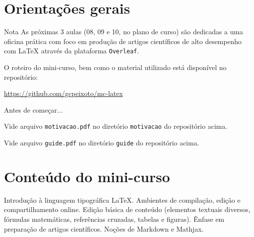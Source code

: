 
\section{Orientações gerais}

\begin{frame}{Nota}
As próximas 3 aulas (08, 09 e 10, no plano de curso) são dedicadas a uma oficina prática com foco em produção de artigos científicos de alto desempenho com {\LaTeX} através da plataforma \texttt{Overleaf}. 

O roteiro do mini-curso, bem como o material utilizado está disponível no repositório: 

\url{https://github.com/gcpeixoto/mc-latex}

\end{frame}

\begin{frame}{Antes de começar...} 

Vide arquivo \texttt{motivacao.pdf} no diretório \texttt{motivacao} do repositório acima. 

Vide arquivo \texttt{guide.pdf} no diretório \texttt{guide} do repositório acima. 

\end{frame}

\section{Conteúdo do mini-curso} 

\begin{frame}

Introdução à linguagem tipográfica {\LaTeX}. Ambientes de compilação, edição e compartilhamento online. Edição básica de conteúdo (elementos textuais diversos, fórmulas matemáticas, referências cruzadas, tabelas e figuras). Ênfase em preparação de artigos científicos. Noções de Markdown e Mathjax.

\end{frame}